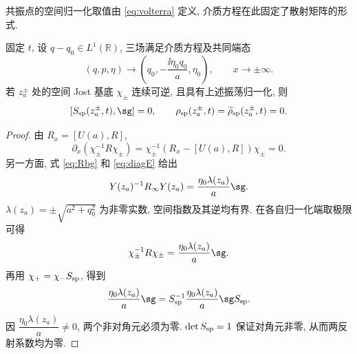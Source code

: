 共振点的空间归一化取值由 \eqref{eq:volterra} 定义, 介质方程在此固定了散射矩阵的形式.

\begin{proposition}[共振点的反射条件]\label{prop:resonance}
固定 $t$, 设 $q-q_0\in L^1(\mathbb R)$, 三场满足介质方程及共同端态
\[
(q,p,\eta)\longrightarrow\left(q_0,-\dfrac{\ii\eta_0q_0}{a},\eta_0\right),\qquad x\to\pm\infty.
\]
若 $z_a^\pm$ 处的空间 Jost 基底 $\chi_\pm$ 连续可逆, 且具有上述振荡归一化, 则
\[
[S_{\rm sp}(z_a^\pm,t),\sg]=0,\qquad
\rho_{\rm sp}(z_a^\pm,t)=\widetilde\rho_{\rm sp}(z_a^\pm,t)=0.
\]
\end{proposition}
\begin{proof}
由 $R_x=[U(a),R]$,
\[
\partial_x(\chi_\pm^{-1}R\chi_\pm)
=\chi_\pm^{-1}(R_x-[U(a),R])\chi_\pm=0.
\]
另一方面, 式 \eqref{eq:Rbg} 和 \eqref{eq:diagE} 给出
\[
Y(z_a)^{-1}R_\infty Y(z_a)=\dfrac{\eta_0\lambda(z_a)}{a}\sg.
\]
$\lambda(z_a)=\pm\sqrt{a^2+q_0^2}$ 为非零实数, 空间指数及其逆均有界. 在各自归一化端取极限可得
\[
\chi_\pm^{-1}R\chi_\pm=\dfrac{\eta_0\lambda(z_a)}{a}\sg.
\]
再用 $\chi_+=\chi_-S_{\rm sp}$, 得到
\[
\dfrac{\eta_0\lambda(z_a)}{a}\sg
=S_{\rm sp}^{-1}\dfrac{\eta_0\lambda(z_a)}{a}\sg S_{\rm sp}.
\]
因 $\dfrac{\eta_0\lambda(z_a)}{a}\ne0$, 两个非对角元必须为零. $\det S_{\rm sp}=1$ 保证对角元非零, 从而两反射系数均为零.
\end{proof}
